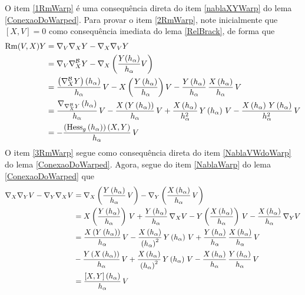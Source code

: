 \begin{demm}
O item \ref{1RmWarp} é uma consequência direta do item \ref{nablaXYWarp} do lema \cref{ConexaoDoWarped}. Para provar o item \ref{2RmWarp}, note inicialmente que $[X, V] = 0$ como consequência imediata do lema \cref{RelBrack}, de forma que 
\begin{align*}
\mathrm{Rm}(V, X)Y &= \nabla_V \nabla_X Y - \nabla_X \nabla_V Y \\
&= \nabla_V \nabla^{\mathcal{B}}_X Y - \nabla_X \left( \frac{Y(h_{\alpha})}{h_{\alpha}} V  \right) \\
&= \frac{\left( \nabla^{\mathcal{B}}_X Y \right)(h_{\alpha}) }{h_{\alpha}} \, V - X \left( \frac{Y\left( h_{\alpha} \right) }{h_{\alpha}}  \right) V - \frac{Y\left( h_{\alpha} \right) }{h_{\alpha}} \, \frac{X\left( h_{\alpha} \right) }{h_{\alpha}} \, V \\
&= \frac{\nabla_{\nabla^{\mathcal{B}}_X Y} \left( h_{\alpha} \right)}{h_{\alpha}} \, V - \frac{X \left( Y\left( h_{\alpha} \right) \right)}{h_{\alpha}} \, V + \frac{X \left( h_{\alpha} \right)}{h_{\alpha}^2} \, Y\left( h_{\alpha} \right) \, V - \frac{X\left( h_{\alpha} \right) \, Y\left(  h_{\alpha} \right)}{h_{\alpha}^2} \, V \\
&=- \frac{\left( \text{Hess}_g \left( h_{\alpha} \right) \right)(X, Y) }{h_{\alpha}} \, V
\end{align*}
O item \ref{3RmWarp} segue como consequência direta do item \ref{NablaVWdoWarp} do lema \cref{ConexaoDoWarped}. Agora, segue do item \ref{NablaWarp} do lema \cref{ConexaoDoWarped} que
\begin{align*}
\cn_X \cn_Y V - \cn_Y \cn_X V &= \cn_X \parent{ \frac{Y \parent{h_{\alpha} }}{h_{\alpha}}  \, V} - \cn_Y \parent{ \frac{X \parent{h_{\alpha} }}{h_{\alpha}} \, V} \\
&= X \parent{\frac{Y \parent{h_{\alpha} }}{h_{\alpha}} } \, V + \frac{Y \parent{h_{\alpha} }}{h_{\alpha}}  \, \cn_X V - Y \parent{\frac{X \parent{h_{\alpha} }}{h_{\alpha}} } \, V  - \frac{X \parent{h_{\alpha} }}{h_{\alpha}} \, \cn_Y V \\
&= \frac{ X\parent{Y\parent{h_{\alpha}} } }{h_{\alpha}}  \, V - \frac{X\parent{h_{\alpha}}}{\parent{h_{\alpha}}^2} \, Y\parent{h_{\alpha}} \, V + \frac{Y\parent{h_{\alpha}} }{h_{\alpha}} \, \frac{X\parent{h_{\alpha}} }{h_{\alpha}} \, V \\
&-\frac{ Y\parent{X\parent{h_{\alpha}} } }{h_{\alpha}}  \, V + \frac{X\parent{h_{\alpha}}}{\parent{h_{\alpha}}^2} \, Y\parent{h_{\alpha}} \, V  - \frac{X\parent{h_{\alpha}} }{h_{\alpha}} \, \frac{Y\parent{h_{\alpha}} }{h_{\alpha}} \, V  \\
&= \frac{[X, Y] \parent{h_{\alpha}}}{h_{\alpha}} \, V \\

\end{align*}
\end{demm}
